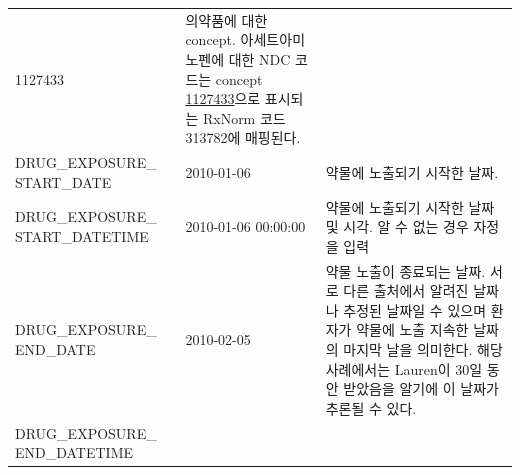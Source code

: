 \documentclass[10.5pt]{book}
\theoremstyle{definition}
\theoremstyle{definition}
\theoremstyle{definition}
\theoremstyle{remark}
\begin{document}
\begin{longtable}[]{@{}lll@{}}
\begin{minipage}[t]{0.16\columnwidth}
1127433\strut
\end{minipage} & \begin{minipage}[t]{0.48\columnwidth}\raggedright\strut
의약품에 대한 concept. 아세트아미노펜에 대한 NDC 코드는 concept
\href{http://athena.ohdsi.org/search-terms/terms/1127433}{1127433}으로
표시되는 RxNorm 코드 313782에 매핑된다.\strut
\end{minipage}\tabularnewline
\begin{minipage}[t]{0.28\columnwidth}\raggedright\strut
DRUG\_EXPOSURE\_ START\_DATE\strut
\end{minipage} & \begin{minipage}[t]{0.16\columnwidth}\raggedright\strut
2010-01-06\strut
\end{minipage} & \begin{minipage}[t]{0.48\columnwidth}\raggedright\strut
약물에 노출되기 시작한 날짜.\strut
\end{minipage}\tabularnewline
\begin{minipage}[t]{0.28\columnwidth}\raggedright\strut
DRUG\_EXPOSURE\_ START\_DATETIME\strut
\end{minipage} & \begin{minipage}[t]{0.16\columnwidth}\raggedright\strut
2010-01-06 00:00:00\strut
\end{minipage} & \begin{minipage}[t]{0.48\columnwidth}\raggedright\strut
약물에 노출되기 시작한 날짜 및 시각. 알 수 없는 경우 자정을 입력\strut
\end{minipage}\tabularnewline
\begin{minipage}[t]{0.28\columnwidth}\raggedright\strut
DRUG\_EXPOSURE\_ END\_DATE\strut
\end{minipage} & \begin{minipage}[t]{0.16\columnwidth}\raggedright\strut
2010-02-05\strut
\end{minipage} & \begin{minipage}[t]{0.48\columnwidth}\raggedright\strut
약물 노출이 종료되는 날짜. 서로 다른 출처에서 알려진 날짜나 추정된
날짜일 수 있으며 환자가 약물에 노출 지속한 날짜의 마지막 날을 의미한다.
해당 사례에서는 Lauren이 30일 동안 받았음을 알기에 이 날짜가 추론될 수
있다.\strut
\end{minipage}\tabularnewline
\begin{minipage}[t]{0.28\columnwidth}\raggedright\strut
DRUG\_EXPOSURE\_ END\_DATETIME\strut
\end{minipage} & \begin{minipage}[t]{0.16\columnwidth}\raggedright\strut

\end{minipage}
\end{longtable}
\end{document}
